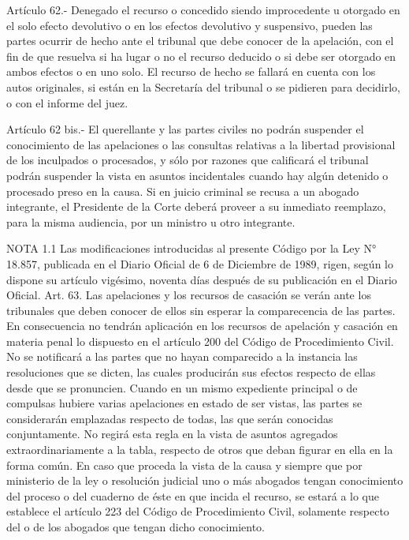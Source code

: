     Artículo 62.- Denegado el recurso o concedido siendo improcedente u otorgado en el solo efecto devolutivo o en los efectos devolutivo y suspensivo, pueden las partes ocurrir de hecho ante el tribunal que debe conocer de la apelación, con el fin de que resuelva si ha lugar o no el recurso deducido o si debe ser otorgado en ambos efectos o en uno solo.
    El recurso de hecho se fallará en cuenta con los autos originales, si están en la Secretaría del tribunal o se pidieren para decidirlo, o con el informe del juez.


    Artículo 62 bis.- El querellante y las partes civiles no podrán suspender el conocimiento de las apelaciones o las consultas relativas a la libertad provisional de los inculpados o procesados, y sólo por razones que calificará el tribunal podrán suspender la vista en asuntos incidentales cuando hay algún detenido o procesado preso en la causa.
    Si en juicio criminal se recusa a un abogado integrante, el Presidente de la Corte deberá proveer a su inmediato reemplazo, para la misma audiencia, por un ministro u otro integrante.





NOTA 1.1
    Las modificaciones introducidas al presente Código por la Ley N° 18.857, publicada en el Diario Oficial de 6 de Diciembre de 1989, rigen, según lo dispone su artículo vigésimo, noventa días después de su publicación en el Diario Oficial.
    Art. 63. Las apelaciones y los recursos de casación se verán ante los tribunales que deben conocer de ellos sin esperar la comparecencia de las partes. En consecuencia no tendrán aplicación en los recursos de apelación y casación en materia penal lo dispuesto en el artículo 200 del Código de Procedimiento Civil.
    No se notificará a las partes que no hayan comparecido a la instancia las resoluciones que se dicten, las cuales producirán sus efectos respecto de ellas desde que se pronuncien.
    Cuando en un mismo expediente principal o de compulsas hubiere varias apelaciones en estado de ser vistas, las partes se considerarán emplazadas respecto de todas, las que serán conocidas conjuntamente.  No regirá esta regla en la vista de asuntos agregados extraordinariamente a la tabla, respecto de otros que deban figurar en ella en la forma común.
    En caso que proceda la vista de la causa y siempre que por ministerio de la ley o resolución judicial uno o más abogados tengan conocimiento del proceso o del cuaderno de éste en que incida el recurso, se estará a lo que establece el artículo 223 del Código de Procedimiento Civil, solamente respecto del o de los abogados que tengan dicho conocimiento.

